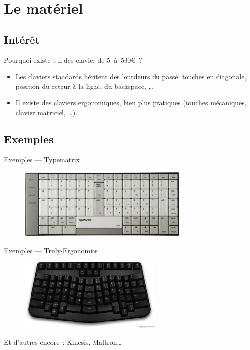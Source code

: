 \section{Le matériel}

\subsection{Intérêt}
\begin{frame}{Pourquoi existe-t-il des clavier de 5~à~500€~?}
    \begin{itemize}
        \item Les claviers standards héritent des lourdeurs du passé: touches
        en diagonale, position  du retour à la ligne, du backspace, … \pause
        \item Il existe des claviers ergonomiques, bien plus pratiques (touches
        mécaniques, clavier matriciel, …).
    \end{itemize}
\end{frame}

\subsection{Exemples}
\begin{frame}{Exemples — Typematrix}
  \begin{figure}
    \centering
    \includegraphics[height=100pt]{images/2030-dvorak.png}
  \end{figure}
\end{frame}

\begin{frame}{Exemples — Truly-Ergonomics}
  \begin{figure}
    \centering
    \includegraphics[height=100pt]{images/t_e_keyboard.jpg}
  \end{figure}

  Et d’autres encore~: Kinesis, Maltron\dots
\end{frame}
